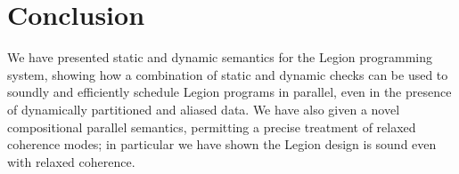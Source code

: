 
\section{Conclusion}
\label{sect:conclusion}

We have presented static and dynamic semantics for the Legion programming system,
showing how a combination of static and dynamic checks can be used to soundly and efficiently schedule
Legion programs in parallel, even in the presence of dynamically partitioned and aliased data.  We have
also given a novel compositional parallel semantics, permitting a precise treatment of relaxed coherence modes;
in particular we have shown the Legion design is sound even with relaxed coherence.


